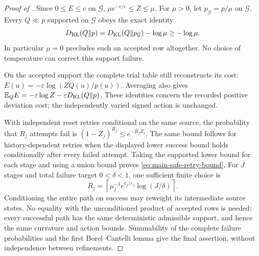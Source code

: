 \documentclass[11pt]{article}
\numberwithin{equation}{section}
\theoremstyle{definition}
\theoremstyle{remark}
\begin{document}
\begin{proof}[Proof of ]
Since $0\le E\le c$ on $\mathcal G$,
$\mu e^{-c/\varepsilon}\le Z\le\mu$.
For $\mu>0$, let $p_{\mathcal G}=p/\mu$ on $\mathcal G$.  Every
$Q\ll p$ supported on $\mathcal G$ obeys the exact identity
\[
 D_{\rm KL}(Q\Vert p)=D_{\rm KL}(Q\Vert p_{\mathcal G})-\log\mu
       \ge-\log\mu.
\]
In particular $\mu=0$ precludes such an accepted row altogether.
No choice of temperature can correct this support failure.

On the accepted support the complete trial table still reconstructs its cost:
$E(u)=-\varepsilon\log(ZQ(u)/p(u))$.  Averaging also gives
$\mathbb E_QE=-\varepsilon\log Z-
\varepsilon D_{\rm KL}(Q\Vert p)$.  These identities concern the recorded
positive deviation cost; the independently varied signed action is unchanged.

With independent reset retries conditional on the same source, the probability
that $R_j$ attempts fail is $(1-Z_j)^{R_j}\le e^{-R_jZ_j}$.
The same bound follows for history-dependent retries when the displayed lower
success bound holds conditionally after every failed attempt.  Taking the
supported lower bound for each stage and using a union bound proves
\eqref{eq:main-safe-retry-bound}.  For $J$ stages and total failure target
$0<\delta<1$, one sufficient finite choice is
\begin{equation}
 R_j=\left\lceil\mu_j^{-1}e^{c_j/\varepsilon_j}
                         \log(J/\delta)\right\rceil.
 \label{eq:supp-safe-retry-cap}
\end{equation}
Conditioning the entire path on success may reweight its intermediate source
states.  No equality with the unconditioned product of accepted rows is needed:
every successful path has the same deterministic admissible support, and hence
the same curvature and action bounds.  Summability of the complete failure
probabilities and the first Borel--Cantelli lemma give the final assertion,
without independence between refinements.
\end{proof}
\end{document}
